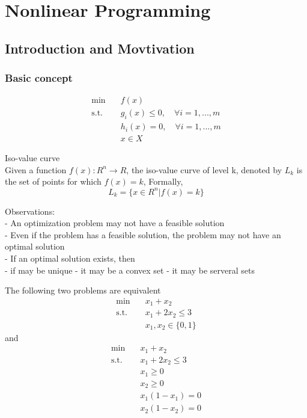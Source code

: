 \part{Nonlinear Programming}
	\chapter{Introduction and Movtivation}
		\section{Basic concept}
			\begin{align}
				\min \quad &f(x) \\
				\text{s.t.} \quad & g_i(x) \le 0, \quad \forall i = 1, ..., m\\
								  & h_i(x) = 0, \quad \forall i = 1, ..., m\\
								  &x \in X
			\end{align}

			Iso-value curve\\
			Given a function $f(x): R^n \rightarrow R$, the iso-value curve of level k, denoted by $L_k$ is the set of points for which $f(x)=k$, Formally,
			\begin{equation}
				L_k = \{x \in R^n | f(x)=k\}
			\end{equation}

			Observations:\\
			\indent - An optimization problem may not have a feasible solution\\
			\indent - Even if the problem has a feasible solution, the problem may not have an optimal solution\\
			\indent - If an optimal solution exists, then\\
			\indent \indent - if may be unique
			\indent \indent - it may be a convex set
			\indent \indent - it may be serveral sets

			The following two problems are equivalent
			\begin{align}
				\min \quad & x_1 + x_2\\
				\text{s.t.} \quad & x_1 + 2x_2\le 3 \\
				                  & x_1, x_2 \in \{0, 1\}
			\end{align}
			and 
			\begin{align}
				\min \quad & x_1 + x_2\\
				\text{s.t.} \quad & x_1 + 2x_2\le 3 \\
				                  & x_1 \ge 0 \\
				                  & x_2 \ge 0 \\
				                  & x_1(1 - x_1) = 0\\
				                  & x_2(1 - x_2) = 0
			\end{align}		

